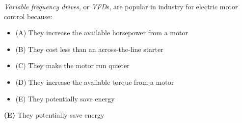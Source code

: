 

{\it Variable frequency drives}, or {\it VFD}s, are popular in industry for electric motor control because:

\begin{itemize}
\item{(A)} They increase the available horsepower from a motor
\vskip 5pt 
\item{(B)} They cost less than an across-the-line starter
\vskip 5pt 
\item{(C)} They make the motor run quieter
\vskip 5pt 
\item{(D)} They increase the available torque from a motor
\vskip 5pt 
\item{(E)} They potentially save energy
\end{itemize}







{\bf (E)} They potentially save energy











